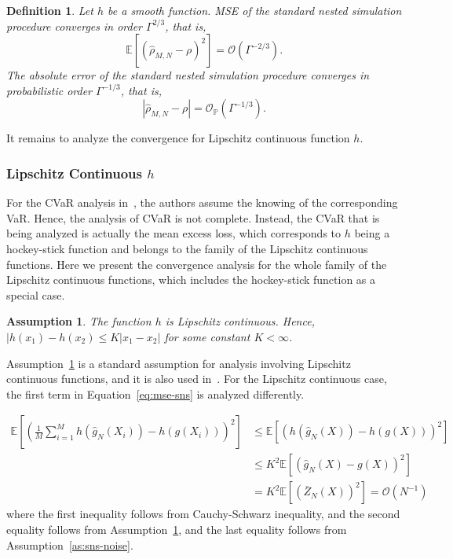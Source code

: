 \documentclass{article}
\newtheorem{definition}{Definition}
\newtheorem{assumption}{Assumption}
\begin{document}
\begin{definition}
    Let $h$ be a smooth function. 
    MSE of the standard nested simulation procedure converges in order $\Gamma^{2/3}$, that is,
    $$\mathbb{E} \left[ \left( \hat{\rho}_{M, N} - \rho \right)^2 \right] = \mathcal{O}(\Gamma^{-2/3}).$$
    The absolute error of the standard nested simulation procedure converges in probabilistic order $\Gamma^{-1/3}$, that is,
    $$\left| \hat{\rho}_{M, N} - \rho \right| = \mathcal{O}_\mathbb{P}(\Gamma^{-1/3}).$$
\end{definition}
It remains to analyze the convergence for Lipschitz continuous function $h$.

\subsubsection*{Lipschitz Continuous $h$}
For the CVaR analysis in~\cite{gordy2010nested}, the authors assume the knowing of the corresponding VaR.
Hence, the analysis of CVaR is not complete.
Instead, the CVaR that is being analyzed is actually the mean excess loss, which corresponds to $h$ being a hockey-stick function and belongs to the family of the Lipschitz continuous functions. 
Here we present the convergence analysis for the whole family of the Lipschitz continuous functions, which includes the hockey-stick function as a special case. 

\begin{assumption} \label{as:sns-lip}
    The function $h$ is Lipschitz continuous. Hence, $|h(x_1) - h(x_2) \leq K|x_1 - x_2|$ for some constant $K< \infty$.
\end{assumption}
Assumption~\ref{as:sns-lip} is a standard assumption for analysis involving Lipschitz continuous functions, and it is also used in~\cite{broadie2015risk}.
For the Lipschitz continuous case, the first term in Equation~\ref{eq:mse-sns} is analyzed differently.

\begin{align}
    \mathbb{E} \left[  \left( \frac{1}{M} \sum_{i=1}^M h\left( \hat{g}_{N}(X_i) \right) -  h\left(g(X_i) \right)  \right)^2\right]    
    & \leq \mathbb{E} \left[ \left( h\left( \hat{g}_{N}(X) \right) -  h\left(g(X) \right)  \right)^2\right]  \nonumber \\
    & \leq K^2 \mathbb{E} \left[ \left( \hat{g}_{N}(X) -  g(X)  \right)^2\right] \nonumber \\
    & = K^2 \mathbb{E} \left[ \left( \bar{Z}_{N}(X) \right)^2\right] = \mathcal{O}(N^{-1})
\end{align}
where the first inequality follows from Cauchy-Schwarz inequality, and the second equality follows from Assumption~\ref{as:sns-lip}, and the last equality follows from Assumption~\ref{as:sns-noise}.
\end{document}
